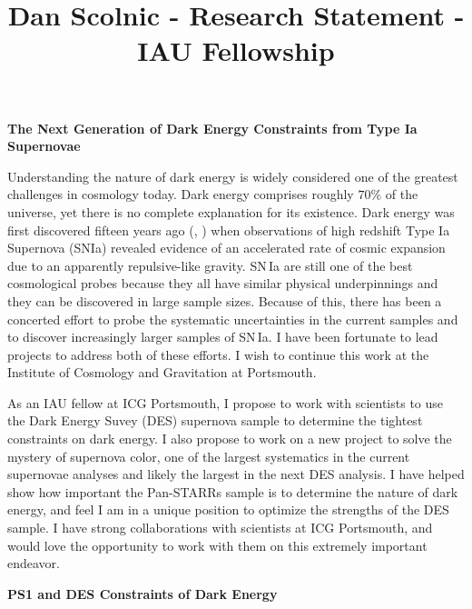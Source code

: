 \documentclass[12pt,preprint]{aastex}
\begin{document}
\title{Dan Scolnic - Research Statement - IAU Fellowship}

\textbf{The Next Generation of Dark Energy Constraints from Type Ia Supernovae}

Understanding the nature of dark energy is widely considered one of the greatest challenges in cosmology today.  Dark energy comprises roughly $70\%$ of the universe, yet there is no complete explanation for its existence.  Dark energy was first discovered fifteen years ago (\citealp{Riess98}, \citealp{Saul99}) when observations of high redshift Type Ia Supernova (SNIa) revealed evidence of an accelerated rate of cosmic expansion due to an apparently repulsive-like gravity.  SN\,Ia are still one of the best cosmological probes because they all have similar physical underpinnings and they can be discovered in large sample sizes.  Because of this, there has been a concerted effort to probe the systematic uncertainties in the current samples and to discover increasingly larger samples of SN\,Ia.  I have been fortunate to lead projects to address both of these efforts.  I wish to continue this work at the Institute of Cosmology and Gravitation at Portsmouth.

As an IAU fellow at ICG Portsmouth, I propose to work with scientists to use the Dark Energy Suvey (DES) supernova sample to determine the tightest constraints on dark energy.  I also propose to work on a new project to solve the mystery of supernova color, one of the largest systematics in the current supernovae analyses and likely the largest in the next DES analysis.  I have helped show how important the Pan-STARRs sample is to determine the nature of dark energy, and feel I am in a unique position to optimize the strengths of the DES sample.  I have strong collaborations with scientists at ICG Portsmouth, and would love the opportunity to work with them on this extremely important endeavor.

\textbf{PS1 and DES Constraints of Dark Energy}
\end{document}
